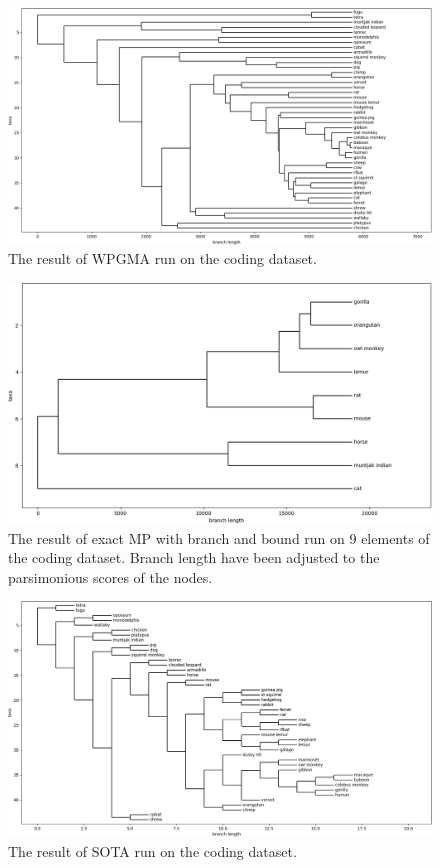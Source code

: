 \documentclass[11pt,twocolumn]{article}
\begin{document}
\begin{figure}
    \centering
    \includegraphics[width=\linewidth]{img/wpgma.png}
    \caption{The result of WPGMA run on the coding dataset.}
    \label{fig:wpgma}
\end{figure}

\begin{figure}
    \centering
    \includegraphics[width=\linewidth]{img/mp_9_taxa.png}
    \caption{The result of exact MP with branch and bound run on 9 elements of the coding dataset. Branch length have been adjusted to the parsimonious scores of the nodes.}
    \label{fig:mp}
\end{figure}

\begin{figure}
    \centering
    \includegraphics[width=\linewidth]{img/sota.png}
    \caption{The result of SOTA run on the coding dataset.}
    \label{fig:sota}
\end{figure}
\end{document}
